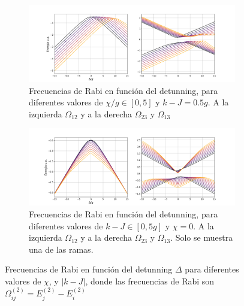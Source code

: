 \begin{figure}
    \centering
    \begin{subfigure}{\textwidth}
        \includegraphics[width=\textwidth]{figuras/ch4/frecuencias k=0.5g chilist.png}
        \caption{Frecuencias de Rabi en función del detunning, para diferentes valores de $\chi/g\in[0,5]$ y $k-J=0.5g$. A la izquierda $\Omega_{12}$ y a la derecha $\Omega_{23}$ y $\Omega_{13}$}
        \label{fig4:rabi chi}
    \end{subfigure}
    \vfill
    \begin{subfigure}{\textwidth}
        \includegraphics[width=\textwidth]{figuras/ch4/frecuencias x=0 klist.png}
        \caption{Frecuencias de Rabi en función del detunning, para diferentes valores de $k-J\in[0,5g]$ y $\chi=0$. A la izquierda $\Omega_{12}$ y a la derecha $\Omega_{23}$ y $\Omega_{13}$. Solo se muestra una de las ramas.}
        \label{fig4:rabi k}
    \end{subfigure}
    \caption{Frecuencias de Rabi en función del detunning $\Delta$ para diferentes valores de $\chi$, y $|k-J|$, donde las frecuencias de Rabi son $\Omega^{(2)}_{ij}=E^{(2)}_{j}-E^{(2)}_{i}$}
    \label{fig4:frecuencias de rabi}
\end{figure}

